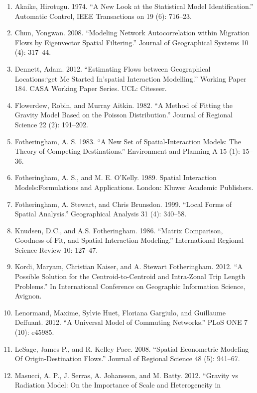 \documentclass[11pt]{article}
\begin{document}
    \begin{enumerate}
\def\labelenumi{\arabic{enumi}.}
\item
  Akaike, Hirotugu. 1974. ``A New Look at the Statistical Model
  Identification.'' Automatic Control, IEEE Transactions on 19 (6):
  716--23.
\item
  Chun, Yongwan. 2008. ``Modeling Network Autocorrelation within
  Migration Flows by Eigenvector Spatial Filtering.'' Journal of
  Geographical Systems 10 (4): 317--44.
\item
  Dennett, Adam. 2012. ``Estimating Flows between Geographical
  Locations:`get Me Started In'spatial Interaction Modelling.'' Working
  Paper 184. CASA Working Paper Series. UCL: Citeseer.
\item
  Flowerdew, Robin, and Murray Aitkin. 1982. ``A Method of Fitting the
  Gravity Model Based on the Poisson Distribution.'' Journal of Regional
  Science 22 (2): 191--202.
\item
  Fotheringham, A. S. 1983. ``A New Set of Spatial-Interaction Models:
  The Theory of Competing Destinations.'' Environment and Planning A 15
  (1): 15--36.
\item
  Fotheringham, A. S., and M. E. O'Kelly. 1989. Spatial Interaction
  Models:Formulations and Applications. London: Kluwer Academic
  Publishers.
\item
  Fotheringham, A. Stewart, and Chris Brunsdon. 1999. ``Local Forms of
  Spatial Analysis.'' Geographical Analysis 31 (4): 340--58.
\item
  Knudsen, D.C., and A.S. Fotheringham. 1986. ``Matrix Comparison,
  Goodness-of-Fit, and Spatial Interaction Modeling.'' International
  Regional Science Review 10: 127--47.
\item
  Kordi, Maryam, Christian Kaiser, and A. Stewart Fotheringham. 2012.
  ``A Possible Solution for the Centroid-to-Centroid and Intra-Zonal
  Trip Length Problems.'' In International Conference on Geographic
  Information Science, Avignon.
\item
  Lenormand, Maxime, Sylvie Huet, Floriana Gargiulo, and Guillaume
  Deffuant. 2012. ``A Universal Model of Commuting Networks.'' PLoS ONE
  7 (10): e45985.
\item
  LeSage, James P., and R. Kelley Pace. 2008. ``Spatial Econometric
  Modeling Of Origin-Destination Flows.'' Journal of Regional Science 48
  (5): 941--67.
\item
  Masucci, A. P., J. Serras, A. Johansson, and M. Batty. 2012. ``Gravity
  vs Radiation Model: On the Importance of Scale and Heterogeneity in

\end{enumerate}
\end{document}

